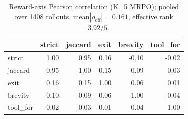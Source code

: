 \begin{table}[h]\centering
\caption{Reward-axis Pearson correlation (K=5 MRPO); pooled over 1408 rollouts. mean$|\rho_{\mathrm{off}}|=0.161$, effective rank $=3.92/5$.}
\begin{tabular}{@{}lrrrrr@{}}\toprule
 & strict & jaccard & exit & brevity & tool\_for \\ \midrule
strict & 1.00 & 0.95 & 0.16 & -0.10 & -0.02 \\
jaccard & 0.95 & 1.00 & 0.15 & -0.09 & -0.03 \\
exit & 0.16 & 0.15 & 1.00 & 0.06 & 0.01 \\
brevity & -0.10 & -0.09 & 0.06 & 1.00 & -0.04 \\
tool\_for & -0.02 & -0.03 & 0.01 & -0.04 & 1.00 \\
\bottomrule\end{tabular}\end{table}
